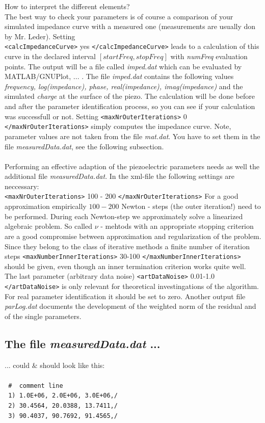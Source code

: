 \noindent How to interpret the different elements?\\
The best way to check your parameters is of course a comparison of your simulated impedance curve with a measured one (measurements are usually don by Mr. Leder). Setting \\ \verb!<calcImpedanceCurve>! yes \verb!</calcImpedanceCurve>! leads to a calculation of this curve in the declared interval $[startFreq,stopFreq]$ with {\em numFreq} evaluation points. The output will be a file called {\em imped.dat} which can be evaluated by MATLAB/GNUPlot, ... . The file {\em imped.dat} contains the following values {\it frequency, log(impedance), phase, real(impedance), imag(impedance)} and the simulated {\it charge} at the surface of the piezo.  The calculation will be done before and after the parameter identification process, so you can see if your calculation was successfull or not. Setting \verb!<maxNrOuterIterations>! 0 \verb!</maxNrOuterIterations>! simply computes the impedance curve. Note, parameter values are not taken from the file {\em mat.dat}. You have to set them in the file {\em measuredData.dat}, see the following subsection.
\\
\\
\noindent Performing an effective adaption of the piezoelectric parameters needs as well the additional file {\em measuredData.dat}. In the xml-file the following settings are neccessary:\\
\noindent \verb!<maxNrOuterIterations>! 100 - 200 \verb!</maxNrOuterIterations>! For a good approximation empirically $100-200$ Newton - steps (the outer iteration!) need to be performed. During each Newton-step we approximately solve a linearized algebraic problem. So called $\nu$ - mehtods with an appropriate stopping criterion are a good compromise between approximation and regularization of the problem. Since they belong to the class of iterative methods a finite number of iteration steps \verb!<maxNumberInnerIterations>! 30-100 \verb!</maxNumberInnerIterations>! should be given, even though an inner termination criterion works quite well.\\ \noindent The last parameter (arbitrary data noise) \verb!<artDataNoise>! 0.01-1.0 \verb!</artDataNoise>! is only relevant for theoretical investingations of the algorithm. For real parameter identification it should be set to zero. Another output file {\em parLog.dat} documents the development of the weighted norm of the residual and of the single parameters.
\\
\subsection{The file  {\em measuredData.dat} ...}
\noindent ... could $\&$ should look like this:\\ \\
\verb! #  comment line !\\
\verb! 1) 1.0E+06, 2.0E+06, 3.0E+06,/ ! \\
\verb! 2) 30.4564, 20.0388, 13.7411,/! \\
\verb! 3) 90.4037, 90.7692, 91.4565,/! \\

